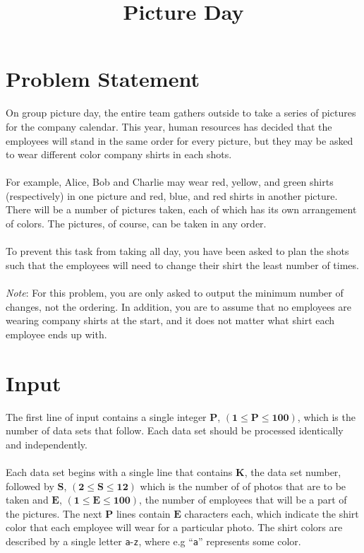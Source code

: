 \documentclass[11pt]{article}
\title{\textbf{Picture Day}}
\date{}
\begin{document}
\maketitle

\section{Problem Statement}
On group picture day, the entire team gathers outside to take a series of
pictures for the company calendar. This year, human resources has decided
that the employees will stand in the same order for every picture, but they
may be asked to wear different color company shirts in each shots.
\\\\
For example, Alice, Bob and Charlie may wear red, yellow, and green shirts
(respectively) in one picture and red, blue, and red shirts in another picture.
There will be a number of pictures taken, each of which has its own arrangement
of colors. The pictures, of course, can be taken in any order.
\\\\
To prevent this task from taking all day, you have been asked to plan the shots
such that the employees will need to change their shirt the least number of times.
\\\\
\emph{Note}: For this problem, you are only asked to output the minimum number of changes,
not the ordering. In addition, you are to assume that no employees are wearing company
shirts at the start, and it does not matter what shirt each employee ends up with.

\section{Input}
The first line of input contains a single integer $\boldsymbol{P}$, $(\boldsymbol{1} \le \boldsymbol{P} \le \boldsymbol{100})$, which is the number of data sets that follow. Each
data set should be processed identically and independently.
\\\\
Each data set begins with a single line that contains $\boldsymbol{K}$, the data
set number, followed by $\boldsymbol{S}$, $(\boldsymbol{2} \le \boldsymbol{S} \le \boldsymbol{12})$
which is the number of of photos that are to be taken and  $\boldsymbol{E}$,
$(\boldsymbol{1} \le \boldsymbol{E} \le \boldsymbol{100})$, the number of employees
that will be a part of the pictures. The next $\boldsymbol{P}$ lines contain $\boldsymbol{E}$
characters each, which indicate the shirt color that each employee will wear for a
particular photo. The shirt colors are described by a single letter \texttt{a}-\texttt{z},
where e.g ``\texttt{a}'' represents some color.
\end{document}
